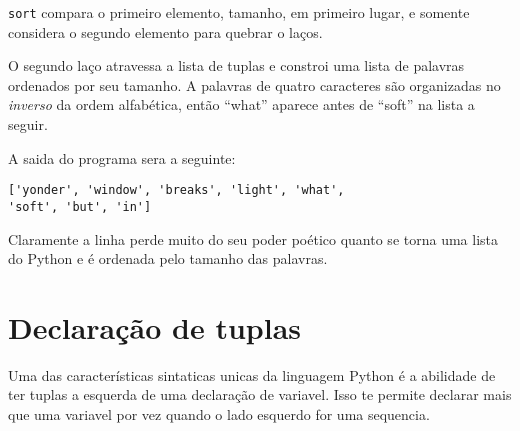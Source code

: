 {\tt sort} compara o primeiro elemento, tamanho, em primeiro lugar, e
somente considera o segundo elemento para quebrar o laços.


O segundo laço atravessa a lista de tuplas e constroi uma lista de 
palavras ordenados por seu tamanho. A palavras de quatro caracteres
são organizadas no {\em inverso} da ordem alfabética, então ``what''
aparece antes de ``soft'' na lista a seguir.

A saida do programa sera a seguinte:
%
\beforeverb
\begin{verbatim}
['yonder', 'window', 'breaks', 'light', 'what', 
'soft', 'but', 'in']
\end{verbatim}
\afterverb
%
Claramente a linha perde muito do seu poder poético
quanto se torna uma lista do Python e é ordenada
pelo tamanho das palavras.

\section{Declaração de tuplas}
\label{tuple assignment}


Uma das características sintaticas unicas da linguagem Python é
a abilidade de ter tuplas a esquerda de uma declaração de variavel.
Isso te permite declarar mais que uma variavel por vez quando o
lado esquerdo for uma sequencia.

